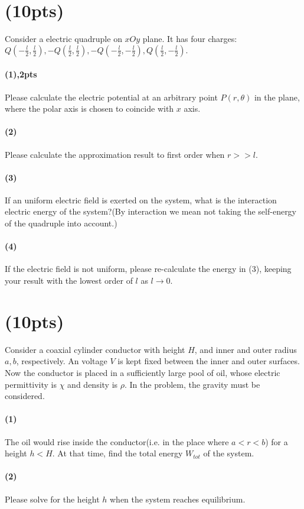 \documentclass{article}
\begin{document}
\section{(10pts)}
Consider a electric quadruple on $xOy$ plane. It has four charges:$Q(-\frac{l}{2},\frac{l}{2}),-Q(\frac{l}{2},\frac{l}{2}),-Q(-\frac{l}{2},-\frac{l}{2}),Q(\frac{l}{2},-\frac{l}{2}).$
\paragraph{(1),2pts}Please calculate the electric potential at an arbitrary point $P(r,\theta)$ in the plane, where the polar axis is chosen to coincide with $x$ axis.
\paragraph{(2)}Please calculate the approximation result to first order when $r>>l$.
\paragraph{(3)}If an uniform electric field is exerted on the system, what is the interaction electric energy of the system?(By interaction we mean not taking the self-energy of the quadruple into account.)
\paragraph{(4)}If the electric field is not uniform, please re-calculate the energy in (3), keeping your result with the lowest order of $l$ as $l\rightarrow 0$.
\section{(10pts)}
Consider a coaxial cylinder conductor with height $H$, and inner and outer radius $a,b$, respectively. An voltage $V$ is kept fixed between the inner and outer surfaces. Now the conductor is placed in a sufficiently large pool of oil, whose electric permittivity is $\chi$ and density is $\rho$. In the problem, the gravity must be considered.
\paragraph{(1)} The oil would rise inside the conductor(i.e. in the place where $a<r<b$)  for a height $h<H$. At that time, find the total energy $W_{tot}$ of the system.
\paragraph{(2)} Please solve for the height $h$ when the system reaches equilibrium.
\end{document}
